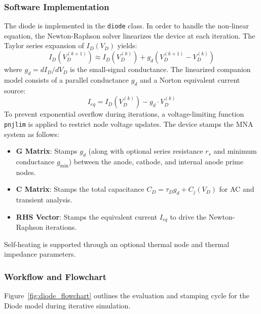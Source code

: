 \subsubsection{Software Implementation}
The diode is implemented in the \texttt{diode} class. In order to handle the non-linear equation, the Newton-Raphson solver linearizes the device at each iteration. The Taylor series expansion of $I_D(V_D)$ yields:
\begin{equation}
    I_D(V_D^{(k+1)}) \approx I_D(V_D^{(k)}) + g_d \left( V_D^{(k+1)} - V_D^{(k)} \right)
\end{equation}
where $g_d = d I_D / d V_D$ is the small-signal conductance. The linearized companion model consists of a parallel conductance $g_d$ and a Norton equivalent current source:
\begin{equation}
    I_{eq} = I_D(V_D^{(k)}) - g_d \cdot V_D^{(k)}
\end{equation}
To prevent exponential overflow during iterations, a voltage-limiting function \texttt{pnjlim} is applied to restrict node voltage updates.
The device stamps the MNA system as follows:
\begin{itemize}
    \item \textbf{G Matrix}: Stamps $g_d$ (along with optional series resistance $r_s$ and minimum conductance $g_{\text{min}}$) between the anode, cathode, and internal anode prime nodes.
    \item \textbf{C Matrix}: Stamps the total capacitance $C_D = \tau_D g_d + C_j(V_D)$ for AC and transient analysis.
    \item \textbf{RHS Vector}: Stamps the equivalent current $I_{eq}$ to drive the Newton-Raphson iterations.
\end{itemize}
Self-heating is supported through an optional thermal node and thermal impedance parameters.

\subsubsection{Workflow and Flowchart}
Figure~\ref{fig:diode_flowchart} outlines the evaluation and stamping cycle for the Diode model during iterative simulation.

